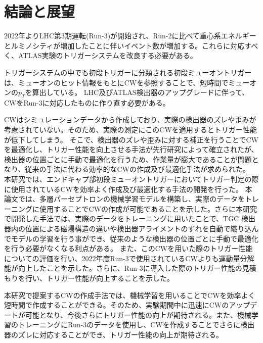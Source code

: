 \chapter{結論と展望}\label{chapter6}
2022年よりLHC第3期運転(Run-3)が開始され、Run-2に比べて重心系エネルギーとルミノシティが増加したことに伴いイベント数が増加する。これらに対応すべく、ATLAS実験のトリガーシステムを改良する必要がある。

トリガーシステムの中でも初段トリガーに分類される初段ミューオントリガーは、ミューオンのヒット情報をもとにCWを参照することで、短時間でミューオンの$p_T$を算出している。
LHC及びATLAS検出器のアップグレードに伴って、CWをRun-3に対応したものに作り直す必要がある。

CWはシミュレーションデータから作成しており、実際の検出器のズレや歪みが考慮されていない。そのため、実際の測定にこのCWを適用するとトリガー性能が低下してしまう。
そこで、検出器のズレや歪みに対する補正を行うことでCWを最適化し、トリガー性能を向上させる手法が先行研究によって確立されたが、検出器の位置ごとに手動で最適化を行うため、作業量が膨大であることが問題となり、従来の手法に代わる効率的なCWの作成及び最適化手法が求められた。
本研究では、エンドキャプ部初段ミューオントリガーにおいてトリガー判定の際に使用されているCWを効率よく作成及び最適化する手法の開発を行った。
本論文では、多層パーセプトロンの機械学習モデルを構築し、実際のデータをトレーニングに使用することでCWの作成が可能であることを示した。さらに本研究で開発した手法では、実際のデータをトレーニングに用いたことで、TGC 検出器内の位置による磁場構造の違いや検出器アライメントのずれを自動で織り込んでモデルの学習を行う事ができ、従来のような検出器の位置ごとに手動で最適化を行う必要がなくなる利点がある。
また、このCWを用いた際のトリガー性能についての評価を行い、2022年度Run-3で使用されているCWよりも運動量分解能が向上したことを示した。さらに、Run-3に導入した際のトリガー性能の見積もりを行い、トリガー性能が向上することを示した。

本研究で提案するCWの作成手法では、機械学習を用いることでCWを効率よく短時間で作成することができる。そのため、実験期間中に迅速にCWのアップデートが可能となり、今後さらにトリガー性能の向上が期待される。また、機械学習のトレーニングにRun-3のデータを使用し、CWを作成することでさらに検出器のズレに対応することができ、トリガー性能の向上が期待される。



